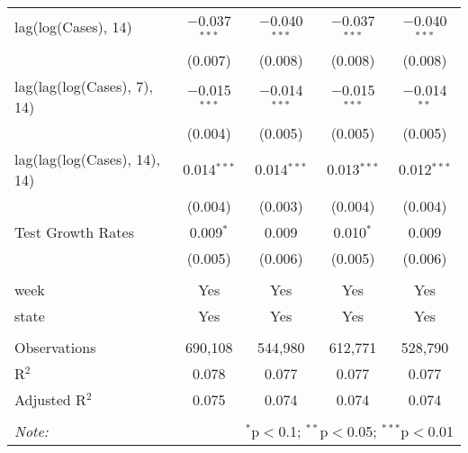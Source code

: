 \begin{tabular}{@{\extracolsep{1pt}}lcccc}
  lag(log(Cases), 14) & $-$0.037$^{***}$ & $-$0.040$^{***}$ & $-$0.037$^{***}$ & $-$0.040$^{***}$ \\ 
  & (0.007) & (0.008) & (0.008) & (0.008) \\ 
  lag(lag(log(Cases), 7), 14) & $-$0.015$^{***}$ & $-$0.014$^{***}$ & $-$0.015$^{***}$ & $-$0.014$^{**}$ \\ 
  & (0.004) & (0.005) & (0.005) & (0.005) \\ 
  lag(lag(log(Cases), 14), 14) & 0.014$^{***}$ & 0.014$^{***}$ & 0.013$^{***}$ & 0.012$^{***}$ \\ 
  & (0.004) & (0.003) & (0.004) & (0.004) \\ 
  Test Growth Rates & 0.009$^{*}$ & 0.009 & 0.010$^{*}$ & 0.009 \\ 
  & (0.005) & (0.006) & (0.005) & (0.006) \\ 
 \hline \\[-1.8ex] 
week & Yes & Yes & Yes & Yes \\ 
state & Yes & Yes & Yes & Yes \\ 
\hline \\[-1.8ex] 
Observations & 690,108 & 544,980 & 612,771 & 528,790 \\ 
R$^{2}$ & 0.078 & 0.077 & 0.077 & 0.077 \\ 
Adjusted R$^{2}$ & 0.075 & 0.074 & 0.074 & 0.074 \\ 
\hline 
\hline \\[-1.8ex] 
\textit{Note:}  & \multicolumn{4}{r}{$^{*}$p$<$0.1; $^{**}$p$<$0.05; $^{***}$p$<$0.01} \\ 
\end{tabular} 